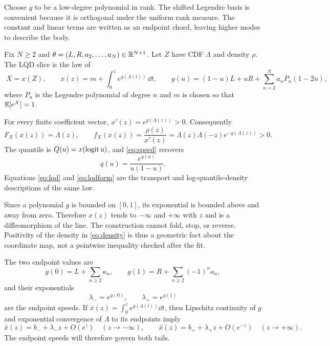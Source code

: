 Choose $g$ to be a low-degree polynomial in rank.  The shifted Legendre basis
is convenient because it is orthogonal under the uniform rank measure.  The
constant and linear terms are written as an endpoint chord, leaving higher
modes to describe the body.

\begin{definition}
\label{def:lqd}
Fix $N\ge2$ and
$\theta=(L,R,a_2,\ldots,a_N)\in\mathbb{R}^{N+1}$.  Let $Z$ have CDF $\Lambda$ and
density $\rho$.  The LQD slice is the law of
\begin{equation}
\boxed{\;
X=x(Z),\qquad
x(z)=m+\int_0^z e^{g(\Lambda(t))}\,\dd t,\qquad
g(u)=(1-u)L+uR+\sum_{n=2}^N a_nP_n(1-2u),
\;}
\label{eq:lqd}
\end{equation}
where $P_n$ is the Legendre polynomial of degree $n$ and $m$ is chosen so
that $\mathbb{E}[e^X]=1$.
\end{definition}

For every finite coefficient vector, $x'(z)=e^{g(\Lambda(z))}>0$.
Consequently
\begin{equation}
F_X(x(z))=\Lambda(z),\qquad
f_X(x(z))=\frac{\rho(z)}{x'(z)}
=\Lambda(z)\Lambda(-z)e^{-g(\Lambda(z))}>0.
\label{eq:density}
\end{equation}
The quantile is $Q(u)=x(\operatorname{logit} u)$, and \eqref{eq:speed} recovers
\begin{equation}
q(u)=\frac{e^{g(u)}}{u(1-u)}.
\label{eq:lqdform}
\end{equation}
Equations \eqref{eq:lqd} and \eqref{eq:lqdform} are the transport and
log-quantile-density descriptions of the same law.

Since a polynomial $g$ is bounded on $[0,1]$, its exponential is bounded
above and away from zero.  Therefore $x(z)$ tends to $-\infty$ and $+\infty$
with $z$ and is a diffeomorphism of the line.  The construction cannot fold,
stop, or reverse.  Positivity of the density in \eqref{eq:density} is thus a
geometric fact about the coordinate map, not a pointwise inequality checked
after the fit.

The two endpoint values are
\begin{equation}
g(0)=L+\sum_{n\ge2}a_n,\qquad
g(1)=R+\sum_{n\ge2}(-1)^na_n,
\label{eq:endpoints}
\end{equation}
and their exponentials
\begin{equation}
\lambda_-=e^{g(0)},\qquad \lambda_+=e^{g(1)}
\label{eq:speeds}
\end{equation}
are the endpoint speeds.  If
$\bar x(z)=\int_0^ze^{g(\Lambda(t))}\dd t$, then Lipschitz continuity of
$g$ and exponential convergence of $\Lambda$ to its endpoints imply
\begin{equation}
\bar x(z)=b_-+\lambda_-z+O(e^z)\quad(z\to-\infty),
\qquad
\bar x(z)=b_++\lambda_+z+O(e^{-z})\quad(z\to+\infty).
\label{eq:asymptotes}
\end{equation}
The endpoint speeds will therefore govern both tails.

